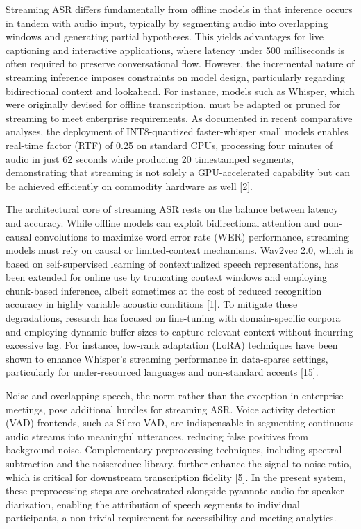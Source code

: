 \documentclass[12pt,a4paper]{article}
\begin{document}
Streaming ASR differs fundamentally from offline models in that inference occurs in tandem with audio input, typically by segmenting audio into overlapping windows and generating partial hypotheses. This yields advantages for live captioning and interactive applications, where latency under 500 milliseconds is often required to preserve conversational flow. However, the incremental nature of streaming inference imposes constraints on model design, particularly regarding bidirectional context and lookahead. For instance, models such as Whisper, which were originally devised for offline transcription, must be adapted or pruned for streaming to meet enterprise requirements. As documented in recent comparative analyses, the deployment of INT8-quantized faster-whisper small models enables real-time factor (RTF) of 0.25 on standard CPUs, processing four minutes of audio in just 62 seconds while producing 20 timestamped segments, demonstrating that streaming is not solely a GPU-accelerated capability but can be achieved efficiently on commodity hardware as well [2].


The architectural core of streaming ASR rests on the balance between latency and accuracy. While offline models can exploit bidirectional attention and non-causal convolutions to maximize word error rate (WER) performance, streaming models must rely on causal or limited-context mechanisms. Wav2vec 2.0, which is based on self-supervised learning of contextualized speech representations, has been extended for online use by truncating context windows and employing chunk-based inference, albeit sometimes at the cost of reduced recognition accuracy in highly variable acoustic conditions [1]. To mitigate these degradations, research has focused on fine-tuning with domain-specific corpora and employing dynamic buffer sizes to capture relevant context without incurring excessive lag. For instance, low-rank adaptation (LoRA) techniques have been shown to enhance Whisper’s streaming performance in data-sparse settings, particularly for under-resourced languages and non-standard accents [15].


Noise and overlapping speech, the norm rather than the exception in enterprise meetings, pose additional hurdles for streaming ASR. Voice activity detection (VAD) frontends, such as Silero VAD, are indispensable in segmenting continuous audio streams into meaningful utterances, reducing false positives from background noise. Complementary preprocessing techniques, including spectral subtraction and the noisereduce library, further enhance the signal-to-noise ratio, which is critical for downstream transcription fidelity [5]. In the present system, these preprocessing steps are orchestrated alongside pyannote-audio for speaker diarization, enabling the attribution of speech segments to individual participants, a non-trivial requirement for accessibility and meeting analytics.
\end{document}
